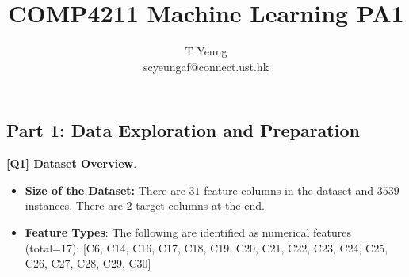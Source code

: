 \documentclass{article}
\title{COMP4211 Machine Learning PA1}
\author{T Yeung \\ scyeungaf@connect.ust.hk}
\begin{document}
\maketitle
\begin{description}
	\section*{Part 1: Data Exploration and Preparation}
	\item \textbf{[Q1] Dataset Overview}.
	\begin{itemize}
		\item \textbf{Size of the Dataset:} There are $31$ feature columns in the dataset and $3539$ instances. There are $2$ target columns at the end.
		\item \textbf{Feature Types}: The following are identified as numerical features (total=17):
				[C6, C14, C16, C17, C18, C19, C20, C21,
				C22, C23, C24, C25, C26, C27, C28, C29, C30]


\end{itemize}
\end{description}
\end{document}
